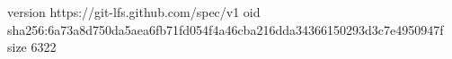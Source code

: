 version https://git-lfs.github.com/spec/v1
oid sha256:6a73a8d750da5aea6fb71fd054f4a46cba216dda34366150293d3c7e4950947f
size 6322
